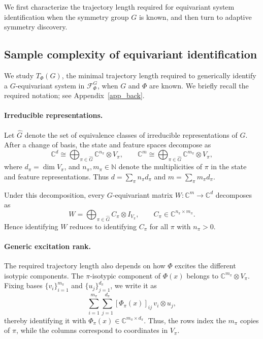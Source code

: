 \documentclass[11pt]{article}
\theoremstyle{plain}
\theoremstyle{definition}
\theoremstyle{remark}
\begin{document}
We first characterize the trajectory length required for equivariant system
identification when the symmetry group \(G\) is known, and then turn to
adaptive symmetry discovery.

\subsection{Sample complexity of equivariant identification}
\label{sec:equivariant_identification}

We study \(T_\Phi(G)\), the minimal trajectory length required to generically
identify a \(G\)-equivariant system in \(\mathcal F_\Phi^G\), when \(G\) and
\(\Phi\) are known. We briefly recall the required notation; see Appendix~\ref{app_back}.

\paragraph{Irreducible representations.}
Let \(\widehat G\) denote the set of equivalence classes of irreducible
representations of \(G\). After a change of basis, the state and feature spaces
decompose as
\[
\mathbb C^d
\cong
\bigoplus_{\pi\in\widehat G}\mathbb C^{n_\pi}\otimes V_\pi,
\qquad
\mathbb C^m
\cong
\bigoplus_{\pi\in\widehat G}\mathbb C^{m_\pi}\otimes V_\pi,
\]
where \(d_\pi=\dim V_\pi\), and \(n_\pi,m_\pi \in \mathbb{N} \) denote the multiplicities of
\(\pi\) in the state and feature representations. Thus
\(d=\sum_\pi n_\pi d_\pi\) and \(m=\sum_\pi m_\pi d_\pi\).

Under this decomposition, every \(G\)-equivariant matrix
\(W:\mathbb C^m\to\mathbb C^d\) decomposes as
\[
W=
\bigoplus_{\pi\in\widehat G} C_\pi\otimes I_{V_\pi},
\qquad
C_\pi\in\mathbb C^{n_\pi\times m_\pi}.
\]
Hence identifying \(W\) reduces to identifying \(C_\pi\) for all
\(\pi\) with \(n_\pi>0\).

\paragraph{Generic excitation rank.}
The required trajectory length also depends on how \(\Phi\) excites the
different isotypic components. The \(\pi\)-isotypic component of \(\Phi(x)\)
belongs to \(\mathbb C^{m_\pi}\otimes V_\pi\). Fixing bases
\(\{v_i\}_{i=1}^{m_\pi}\) and \(\{u_j\}_{j=1}^{d_\pi}\), we write it as
\[
\sum_{i=1}^{m_\pi}\sum_{j=1}^{d_\pi}
[\Phi_\pi(x)]_{ij}\,v_i\otimes u_j,
\]
thereby identifying it with
\(\Phi_\pi(x)\in\mathbb C^{m_\pi\times d_\pi}\). Thus, the rows index the
\(m_\pi\) copies of \(\pi\), while the columns correspond to coordinates in
\(V_\pi\).
\end{document}
